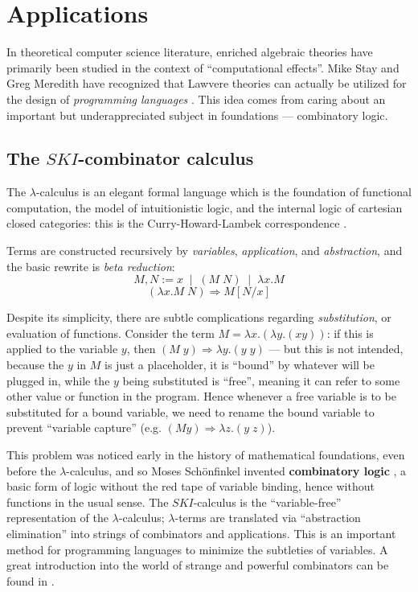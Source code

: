 \documentclass{amsart}
\theoremstyle{definition}
\begin{document}
\section{Applications}

In theoretical computer science literature, enriched algebraic theories have primarily been studied in the context of ``computational effects''. Mike Stay and Greg Meredith have recognized that Lawvere theories can actually be utilized for the design of \textit{programming languages} \cite{ladl}. This idea comes from caring about an important but underappreciated subject in foundations --- combinatory logic.

\subsection{The $SKI$-combinator calculus}
The $\lambda$-calculus is an elegant formal language which is the foundation of functional computation, the model of intuitionistic logic, and the internal logic of cartesian closed categories: this is the Curry-Howard-Lambek correspondence \cite{rosetta}.

Terms are constructed recursively by \textit{variables}, \textit{application}, and \textit{abstraction}, and the basic rewrite is \textit{beta reduction}: $$M,N := x \;\; | \;\; (M\; N) \;\; | \;\; \lambda x.M$$ $$(\lambda x.M\; N) \Rightarrow M[N/x]$$

Despite its simplicity, there are subtle complications regarding \textit{substitution}, or evaluation of functions. Consider the term $M = \lambda x.(\lambda y.(xy))$: if this is applied to the variable $y$, then $(M\; y) \Rightarrow \lambda y.(y\; y)$ --- but this is not intended, because the $y$ in $M$ is just a placeholder, it is ``bound'' by whatever will be plugged in, while the $y$ being substituted is ``free'', meaning it can refer to some other value or function in the program. Hence whenever a free variable is to be substituted for a bound variable, we need to rename the bound variable to prevent ``variable capture'' (e.g. $(M y) \Rightarrow \lambda z.(y\; z)$).

This problem was noticed early in the history of mathematical foundations, even before the $\lambda$-calculus, and so Moses Sch\"onfinkel invented \textbf{combinatory logic} \cite{combs}, a basic form of logic without the red tape of variable binding, hence without functions in the usual sense. The $SKI$-calculus is the ``variable-free'' representation of the $\lambda$-calculus; $\lambda$-terms are translated via ``abstraction elimination'' into strings of combinators and applications. This is an important method for programming languages to minimize the subtleties of variables. A great introduction into the world of strange and powerful combinators can be found in \cite{tmam}.
\end{document}
